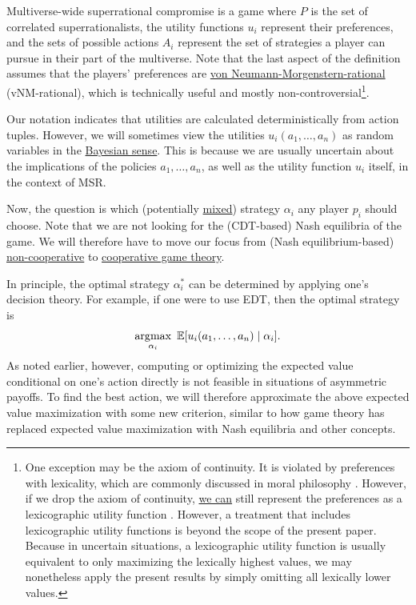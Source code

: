 Multiverse-wide superrational compromise is a game where \(P\) is the
set of correlated superrationalists, the utility functions \(u_{i}\)
represent their preferences, and the sets of possible actions \(A_{i}\)
represent the set of strategies a player can pursue in their part of the
multiverse. Note that the last aspect of the definition assumes that the
players' preferences are
\href{https://en.wikipedia.org/wiki/Von_Neumann\%E2\%80\%93Morgenstern_utility_theorem\#The_axioms}{von
Neumann-Morgenstern-rational} (vNM-rational), which is technically
useful and mostly non-controversial\footnote{One exception may be the
  axiom of continuity. It is violated by preferences with lexicality,
  which are commonly discussed in moral philosophy
  \parencite{Knutsson2016-kd}. However, if we drop the axiom
  of continuity,
  \href{https://casparoesterheld.com/2016/08/08/lexicographic-utility-functions/}{we
  can} still represent the preferences as a lexicographic utility
  function \parencite{Blume1989-fd,Fishburn1971-bx}.
  However, a treatment that includes lexicographic utility functions is
  beyond the scope of the present paper. Because in uncertain
  situations, a lexicographic utility function is usually equivalent to
  only maximizing the lexically highest values, we may nonetheless apply
  the present results by simply omitting all lexically lower values.}.

Our notation indicates that utilities are calculated deterministically
from action tuples. However, we will sometimes view the utilities
\(u_{i}(a_{1},\dotsc,a_{n})\) as random variables in the
\href{https://en.wikipedia.org/wiki/Bayesian_probability}{Bayesian
sense}. This is because we are usually uncertain about the implications
of the policies \(a_{1},\dotsc,a_{n}\), as well as the utility function
\(u_{i}\) itself, in the context of MSR.

Now, the question is which (potentially
\href{https://en.wikipedia.org/wiki/Strategy_(game_theory)\#Mixed_strategy}{mixed})
strategy \(\alpha_{i}\) any player \(p_{i}\) should choose. Note that we
are not looking for the (CDT-based) Nash equilibria of the game. We will
therefore have to move our focus from (Nash equilibrium-based)
\href{https://en.wikipedia.org/wiki/Non-cooperative_game_theory}{non-cooperative}
to
\href{https://en.wikipedia.org/wiki/Cooperative_game_theory}{cooperative
game theory}.

In principle, the optimal strategy \(\alpha_{i}^{*}\) can be determined
by applying one's decision theory. For example, if one were to use EDT,
then the optimal strategy is
$$
\operatorname*{\arg\!\max}_{\alpha_{i}}\ \mathbb{E}\lbrack u_{i}(a_{1},\dotsc,a_{n})\mid \alpha_{i}\rbrack.
$$
As noted earlier, however, computing or optimizing the expected value
conditional on one's action directly is not feasible in situations of
asymmetric payoffs. To find the best action, we will therefore
approximate the above expected value maximization with some new
criterion, similar to how game theory has replaced expected value
maximization with Nash equilibria and other concepts.

